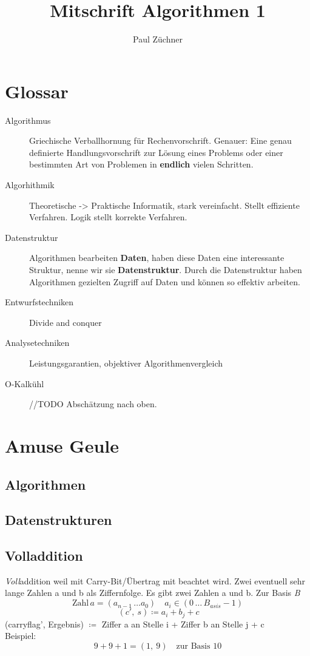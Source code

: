 \documentclass[a4paper]{scrartcl}
\title{Mitschrift Algorithmen 1}
\author{Paul Züchner}
\begin{document}
\maketitle

\tableofcontents

\newpage
\section{Glossar}
\begin{description}  
	\item[Algorithmus] 
		Griechische Verballhornung für Rechenvorschrift. Genauer: Eine genau definierte Handlungsvorschrift zur Lösung eines Problems oder einer bestimmten Art von Problemen in \textbf{endlich} vielen Schritten.
	
	\item[Algorhithmik] 
		Theoretische -> Praktische Informatik, stark vereinfacht. Stellt effiziente Verfahren. Logik stellt korrekte Verfahren. 
	
	\item[Datenstruktur] 
		Algorithmen bearbeiten \textbf{Daten}, haben diese Daten eine interessante Struktur, nenne wir sie \textbf{Datenstruktur}. Durch die Datenstruktur haben Algorithmen gezielten Zugriff auf Daten und können so effektiv arbeiten.
	
	\item[Entwurfstechniken] 
		Divide and conquer
	
	\item[Analysetechniken] 
		Leistungsgarantien, objektiver Algorithmenvergleich
	
	\item[O-Kalkühl] 
		//TODO Abschätzung nach oben.
\end{description}

\section{Amuse Geule}
	\subsection{Algorithmen}
	\subsection{Datenstrukturen}
	
	\subsection{Volladdition}
		\emph{Voll}addition weil mit Carry-Bit/Übertrag mit beachtet wird. Zwei eventuell sehr lange Zahlen a und b als Ziffernfolge. Es gibt zwei Zahlen a und b. Zur Basis \emph{B} 
		 \[ \text{Zahl} \, a = (a_{n-1} \, \dots a_0) \quad a_i \in (0 \, \dots \, B_{asis} - 1) \]
	 	\[\ (c', \: s ) \coloneqq  a_i + b_j + c\] 
	 	(carryflag', Ergebnis) \( \coloneqq \) Ziffer a an Stelle i + Ziffer b an Stelle j + c\\
	 	Beispiel: 
	 	\[9 + 9 +1 = (1, \: 9) \quad \text{zur Basis 10}\]
	 		
\end{document}
